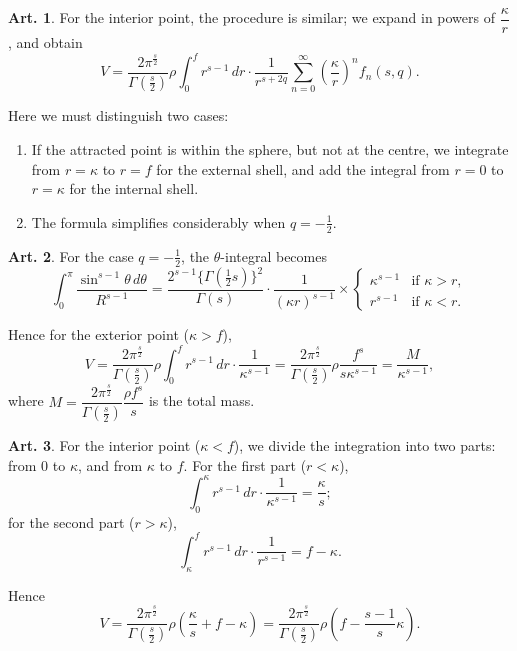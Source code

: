 \documentclass[12pt,a4paper]{article}
\theoremstyle{definition}
\newtheorem{art}{Art.}[section]
\begin{document}
\begin{art}\label{art:68}
For the interior point, the procedure is similar; we expand in powers of $\dfrac{\kappa}{r}$, and obtain
\[
V = \frac{2\pi^{\frac{s}{2}}}{\Gamma(\frac{s}{2})} \rho \int_0^f r^{s-1} \, dr \cdot \frac{1}{r^{s+2q}} \sum_{n=0}^\infty \left(\frac{\kappa}{r}\right)^n f_n(s,q).
\]

Here we must distinguish two cases:
\begin{enumerate}[label=\arabic*.]
\item If the attracted point is within the sphere, but not at the centre, we integrate from $r = \kappa$ to $r = f$ for the external shell, and add the integral from $r = 0$ to $r = \kappa$ for the internal shell.
\item The formula simplifies considerably when $q = -\tfrac{1}{2}$.
\end{enumerate}
\end{art}

\begin{art}\label{art:69}
For the case $q = -\tfrac{1}{2}$, the $\theta$-integral becomes
\[
\int_0^\pi \frac{\sin^{s-1}\theta \, d\theta}{R^{s-1}} = \frac{2^{s-1}\{\Gamma(\frac{1}{2}s)\}^2}{\Gamma(s)} \cdot \frac{1}{(\kappa r)^{s-1}} \times \begin{cases} \kappa^{s-1} & \text{if } \kappa > r, \\ r^{s-1} & \text{if } \kappa < r. \end{cases}
\]

Hence for the exterior point ($\kappa > f$),
\[
V = \frac{2\pi^{\frac{s}{2}}}{\Gamma(\frac{s}{2})} \rho \int_0^f r^{s-1} \, dr \cdot \frac{1}{\kappa^{s-1}} = \frac{2\pi^{\frac{s}{2}}}{\Gamma(\frac{s}{2})} \rho \frac{f^s}{s\kappa^{s-1}} = \frac{M}{\kappa^{s-1}},
\]
where $M = \dfrac{2\pi^{\frac{s}{2}}}{\Gamma(\frac{s}{2})} \dfrac{\rho f^s}{s}$ is the total mass.
\end{art}

\begin{art}\label{art:70}
For the interior point ($\kappa < f$), we divide the integration into two parts: from $0$ to $\kappa$, and from $\kappa$ to $f$. For the first part ($r < \kappa$),
\[
\int_0^\kappa r^{s-1} \, dr \cdot \frac{1}{\kappa^{s-1}} = \frac{\kappa}{s};
\]
for the second part ($r > \kappa$),
\[
\int_\kappa^f r^{s-1} \, dr \cdot \frac{1}{r^{s-1}} = f - \kappa.
\]

Hence
\[
V = \frac{2\pi^{\frac{s}{2}}}{\Gamma(\frac{s}{2})} \rho \left(\frac{\kappa}{s} + f - \kappa\right) = \frac{2\pi^{\frac{s}{2}}}{\Gamma(\frac{s}{2})} \rho \left(f - \frac{s-1}{s}\kappa\right).
\]
\end{art}
\end{document}
